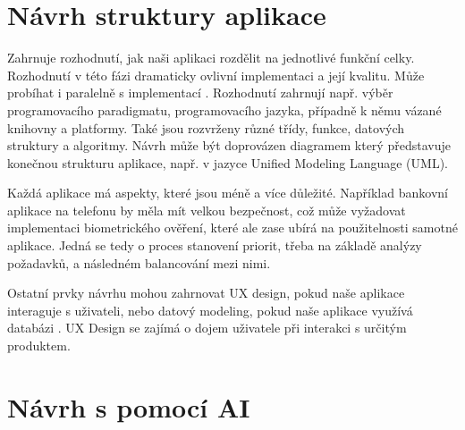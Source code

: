 \documentclass[FM,DP]{tulthesis}
\begin{document}
		\section{Návrh struktury aplikace}
		Zahrnuje rozhodnutí, jak naši aplikaci rozdělit na jednotlivé funkční celky. Rozhodnutí v této fázi dramaticky ovlivní implementaci a její kvalitu. Může probíhat i paralelně s implementací \cite{knuth1989notes} \cite{wikipedia:soft_design}. Rozhodnutí zahrnují např. výběr programovacího paradigmatu, programovacího jazyka, případně k němu vázané knihovny a platformy. Také jsou rozvrženy různé třídy, funkce, datových struktury a algoritmy. Návrh může být doprovázen diagramem který představuje konečnou strukturu aplikace, např. v jazyce Unified Modeling Language (UML).
		
		Každá aplikace má aspekty, které jsou méně a více důležité. Například bankovní aplikace na telefonu by měla mít velkou bezpečnost, což může vyžadovat implementaci biometrického ověření, které ale zase ubírá na použitelnosti samotné aplikace. Jedná se tedy o proces stanovení priorit, třeba na základě analýzy požadavků, a následném balancování mezi nimi.
		
		Ostatní prvky návrhu mohou zahrnovat UX design, pokud naše aplikace interaguje s uživateli, nebo datový modeling, pokud naše aplikace využívá databázi \cite{wikipedia:soft_design}. UX Design se zajímá o dojem uživatele při interakci s určitým produktem.
		
		\section{Návrh s pomocí AI}
\end{document}
